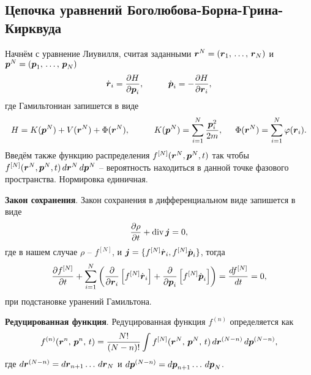 

\subsection{Цепочка уравнений Боголюбова-Борна-Грина-Кирквуда}

Начнём с уравнение Лиувилля, считая заданными $\boldsymbol{r}^N = (\boldsymbol{r}_1,\,  \ldots,\, \boldsymbol{r}_N)$ и $\boldsymbol{p}^N = (\boldsymbol{p}_1,\,  \ldots,\, \boldsymbol{p}_N)$
\begin{equation*}
	\dot{\vc{r}}_i = \frac{\partial H}{\partial \vc{p}_i},
	\hspace{10 mm} 
	\dot{\vc{p}}_i = -\frac{\partial H}{\partial \vc{r}_i},
\end{equation*}
где Гамильтониан запишется в виде
\begin{equation*}
	H = K(\vc{p}^N) + V(\vc{r}^N) + \Phi (\vc{r}^N),
	\hspace{10 mm} 
	K(\vc{p}^N) = \sum_{i=1}^{N} \frac{\vc{p}_i^2}{2m},
	\hspace{5 mm} 
	\Phi (\vc{r}^N) = \sum_{i=1}^{N} \varphi (\vc{r}_i).
\end{equation*}
Введём также функцию распределения $f^{[N]}(\boldsymbol{r}^N, \boldsymbol{p}^N, t)$ так чтобы $f^{[N]}(\boldsymbol{r}^N, \boldsymbol{p}^N, t) \, d \boldsymbol{r}^N \, d \boldsymbol{p}^N$ -- вероятность находиться в данной точке фазового пространства. Нормировка единичная. 

\textbf{Закон сохранения}.
Закон сохранения в дифференциальном виде запишется в виде
\begin{equation*}
	\frac{\partial \rho}{\partial t} + \mathop{\mathrm{div}}\nolimits \boldsymbol{j} = 0,
\end{equation*}
где в нашем случае $\rho$ -- $f^{[N]}$, и $\boldsymbol{j} = \{f^{[N]} \dot{\boldsymbol{r}}_i, f^{[N]} \dot{\boldsymbol{p}}_i\}$, тогда
\begin{equation*}
	\frac{\partial f^{[N]}}{\partial t} + \sum_{i=1}^{N}\left( \frac{\partial }{\partial \boldsymbol{r}_i} \left[f^{[N]} \dot{\boldsymbol{r}}_i\right] + \frac{\partial }{\partial \boldsymbol{p}_i} \left[
				f^{[N]} \dot{\boldsymbol{p}}_i
			\right]\right) = \frac{d f^{[N]}}{d t} = 0, 
\end{equation*}
при подстановке уранений Гамильтона. 



\textbf{Редуцированная функция}. Редуцированная функция $f^{(n)}$ определяется как
\begin{equation*}
	f^{(n)} (\boldsymbol{r}^n,\, \boldsymbol{p}^n,\, t) = \frac{N!}{(N-n)!} \int f^{[N]} (\boldsymbol{r}^N,\, \boldsymbol{p}^N,\, t) \, d \boldsymbol{r}^{(N-n)} \, d \boldsymbol{p}^{(N-n)},
\end{equation*}
где $d \boldsymbol{r}^{(N-n)} = d \boldsymbol{r}_{n+1} \ldots \, d \boldsymbol{r}_N$ и $d \boldsymbol{p}^{(N-n)} = d \boldsymbol{p}_{n+1} \ldots \, d \boldsymbol{p}_N$. 

